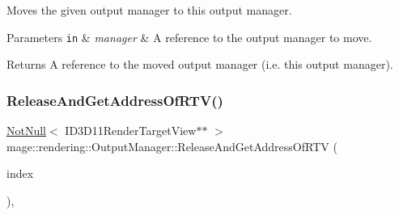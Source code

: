Moves the given output manager to this output manager.


\begin{DoxyParams}[1]{Parameters}
\mbox{\tt in}  & {\em manager} & A reference to the output manager to move. \\
\hline
\end{DoxyParams}
\begin{DoxyReturn}{Returns}
A reference to the moved output manager (i.\+e. this output manager). 
\end{DoxyReturn}
\hypertarget{classmage_1_1rendering_1_1_output_manager_a997a7c48090b5b68e643f3158e9e9d7e}{}\label{classmage_1_1rendering_1_1_output_manager_a997a7c48090b5b68e643f3158e9e9d7e} 
\subsubsection{\texorpdfstring{Release\+And\+Get\+Address\+Of\+R\+T\+V()}{ReleaseAndGetAddressOfRTV()}}
{\footnotesize\ttfamily \hyperlink{namespacemage_a8769f9d670d6b585ea306cb1062af94b}{Not\+Null}$<$ I\+D3\+D11\+Render\+Target\+View$\ast$$\ast$ $>$ mage\+::rendering\+::\+Output\+Manager\+::\+Release\+And\+Get\+Address\+Of\+R\+TV (\begin{DoxyParamCaption}\item[{\hyperlink{classmage_1_1rendering_1_1_output_manager_af9caebb7e9cacf454d26b827a01e857c}{R\+T\+V\+Index}}]{index }\end{DoxyParamCaption})\hspace{0.3cm}{\ttfamily [private]}, {\ttfamily [noexcept]}}

\hypertarget{classmage_1_1rendering_1_1_output_manager_afd13c25f8ab6cfafc5d694d3b64405f9}{}\label{classmage_1_1rendering_1_1_output_manager_afd13c25f8ab6cfafc5d694d3b64405f9} 
